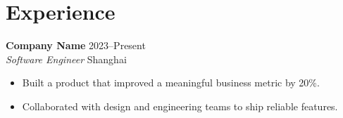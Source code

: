 \section*{Experience}
\textbf{Company Name} \hfill 2023--Present\\
\textit{Software Engineer} \hfill Shanghai
\begin{itemize}
  \item Built a product that improved a meaningful business metric by 20\%.
  \item Collaborated with design and engineering teams to ship reliable features.
\end{itemize}
